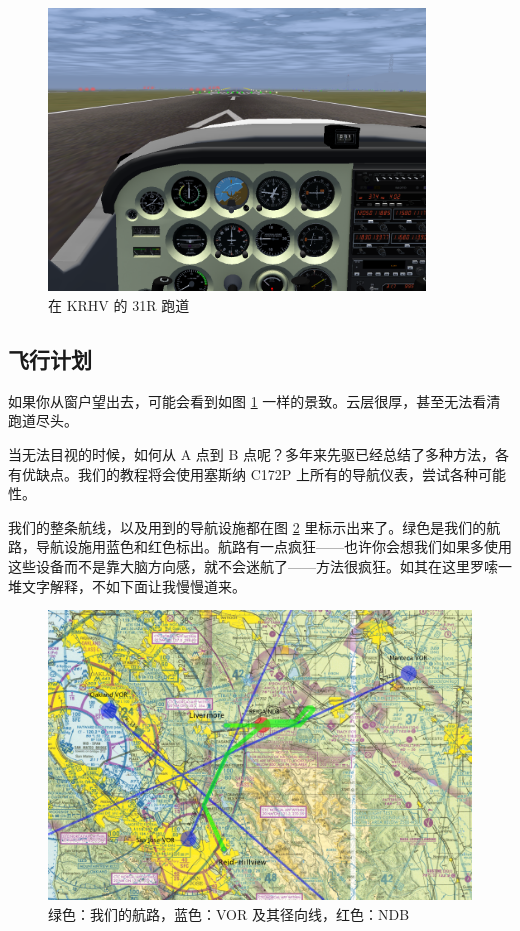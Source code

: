 \begin{figure}
  \begin{center}
    \includegraphics[width=10cm]{img/KRHV}
    \caption{在 KRHV 的 31R 跑道}
    \label{fig:KRHV}
  \end{center}
\end{figure}

\subsection{飞行计划}

如果你从窗户望出去，可能会看到如图 \ref{fig:KRHV} 一样的景致。云层很厚，甚至无法看清跑道尽头。

当无法目视的时候，如何从 A 点到 B 点呢？多年来先驱已经总结了多种方法，各有优缺点。我们的教程将会使用塞斯纳 C172P 上所有的导航仪表，尝试各种可能性。

我们的整条航线，以及用到的导航设施都在图 \ref{fig:sectional_labelled} 里标示出来了。绿色是我们的航路，导航设施用蓝色和红色标出。航路有一点疯狂——也许你会想我们如果多使用这些设备而不是靠大脑方向感，就不会迷航了——方法很疯狂。如其在这里罗嗦一堆文字解释，不如下面让我慢慢道来。

\begin{figure}
  \begin{center}
    \includegraphics[width=20cm, angle=-90]{img/sectional_labelled}
    \caption{绿色：我们的航路，蓝色：VOR 及其径向线，红色：NDB}
    \label{fig:sectional_labelled}
  \end{center}
\end{figure}

